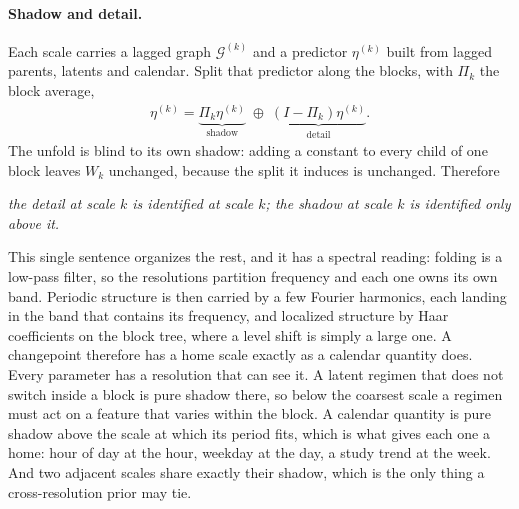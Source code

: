 \paragraph{Shadow and detail.}
Each scale carries a lagged graph \(\mathcal G^{(k)}\) and a predictor
\(\eta^{(k)}\) built from lagged parents, latents and calendar. Split that
predictor along the blocks, with \(\Pi_k\) the block average,
\begin{align}
 \eta^{(k)}
 =\underbrace{\Pi_k\eta^{(k)}}_{\text{shadow}}
 \;\oplus\;
 \underbrace{(I-\Pi_k)\eta^{(k)}}_{\text{detail}} .
 \label{eq:syn_split}
\end{align}
The unfold is blind to its own shadow: adding a constant to every child of one
block leaves \(W_k\) unchanged, because the split it induces is unchanged.
Therefore
\begin{center}
\emph{the detail at scale \(k\) is identified at scale \(k\); the shadow at
scale \(k\) is identified only above it.}
\end{center}
This single sentence organizes the rest, and it has a spectral reading: folding
is a low-pass filter, so the resolutions partition frequency and each one owns
its own band. Periodic structure is then carried by a few Fourier harmonics,
each landing in the band that contains its frequency, and localized structure by
Haar coefficients on the block tree, where a level shift is simply a large one.
A changepoint therefore has a home scale exactly as a calendar quantity does.
Every parameter has a resolution that can see it. A latent regimen that does not switch inside a block is pure shadow
there, so below the coarsest scale a regimen must act on a feature that varies
within the block. A calendar quantity is pure shadow above the scale at which
its period fits, which is what gives each one a home: hour of day at the hour,
weekday at the day, a study trend at the week. And two adjacent scales share
exactly their shadow, which is the only thing a cross-resolution prior may tie.

